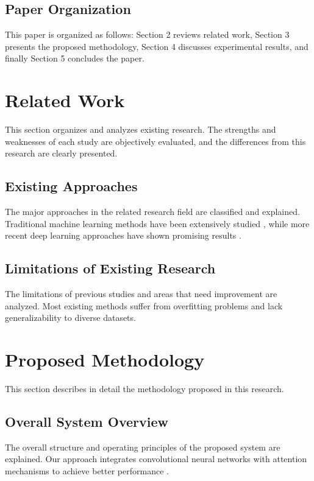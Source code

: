 \documentclass[12pt,a4paper]{article}
\begin{document}
\subsection{Paper Organization}
This paper is organized as follows: Section 2 reviews related work, Section 3 presents the proposed methodology, Section 4 discusses experimental results, and finally Section 5 concludes the paper.

\section{Related Work}
\label{sec:related_work}

This section organizes and analyzes existing research. The strengths and weaknesses of each study are objectively evaluated, and the differences from this research are clearly presented.

\subsection{Existing Approaches}
The major approaches in the related research field are classified and explained. Traditional machine learning methods have been extensively studied \cite{hastie2009elements}, while more recent deep learning approaches have shown promising results \cite{schmidhuber2015deep}.

\subsection{Limitations of Existing Research}
The limitations of previous studies and areas that need improvement are analyzed. Most existing methods suffer from overfitting problems and lack generalizability to diverse datasets.

\section{Proposed Methodology}
\label{sec:methodology}

This section describes in detail the methodology proposed in this research.

\subsection{Overall System Overview}
The overall structure and operating principles of the proposed system are explained. Our approach integrates convolutional neural networks with attention mechanisms to achieve better performance \cite{vaswani2017attention}.
\end{document}
